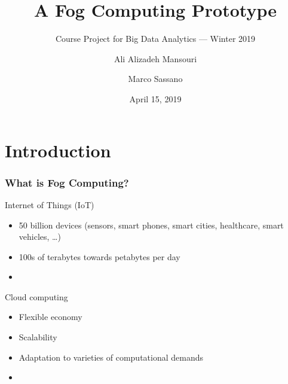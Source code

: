 \documentclass[xelatex,usenames,dvipsnames]{beamer}
\title[Crisis] %
{A Fog Computing Prototype}
\subtitle{Course Project for Big Data Analytics --- Winter 2019}
\author[Ali, Marco] %
{Ali Alizadeh Mansouri \and Marco Sassano}
\institute[Concordia University] %
{
    Concordia University\\
}
\date[April 15, 2019] %
{April 15, 2019}
\begin{document}
\frame{\titlepage}






\section[Introduction]{Introduction}



  \begin{frame}
    \frametitle{What is Fog Computing?}
    \alert{Internet of Things (IoT)}
    
    \begin{itemize}
      \item 50 billion devices (sensors, smart phones, smart cities, healthcare, smart vehicles, \ldots)\cite{cisco2011}
      \item 100s of terabytes towards petabytes per day 
      \item {\color{RedOrange}{limited computing resources}}
    \end{itemize} 

    \pause

    \alert{Cloud computing}
    \begin{itemize}
      \item Flexible economy
      \item Scalability
      \item Adaptation to varieties of computational demands
      \item {\color{RedOrange}{Suffers from high latency}}
    \end{itemize}
  \end{frame}
\end{document}
